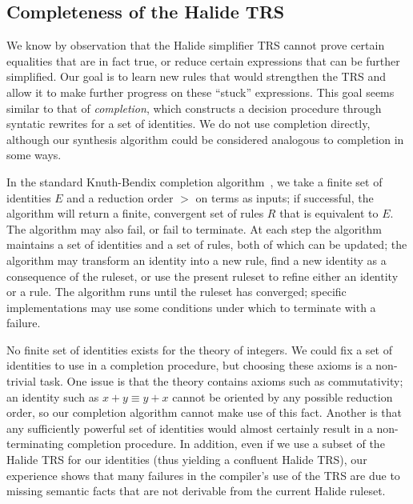 \subsection{Completeness of the Halide TRS}
\label{sec:completion}

We know by observation that the Halide simplifier TRS cannot prove certain equalities 
that are in fact true, or reduce certain expressions that can be further simplified. 
Our goal is to learn new rules that would strengthen the TRS and allow it to make
further progress on these ``stuck'' expressions. This goal seems similar to that of 
\emph{completion}, which constructs a decision procedure through syntatic rewrites
for a set of identities. We do not use completion directly, although
our synthesis algorithm could be considered analogous to completion in some ways.

In the standard Knuth-Bendix completion algorithm~\citep{knuth1983simple}, we take a
finite set of identities $E$ and a reduction order $>$ on terms as inputs; if successful, the
algorithm will return a finite, convergent set of rules $R$ that is equivalent to 
$E$. The algorithm may also fail, or fail to terminate. At each step the algorithm
maintains a set of identities and a set of rules, both of which can be updated; the 
algorithm may transform an identity into a new rule, find a new identity as a 
consequence of the ruleset, or use the present ruleset to refine either an identity 
or a rule. The algorithm runs until the ruleset has converged; specific implementations
may use some conditions under which to terminate with a failure.

No finite set of identities exists for the theory of integers. We could
fix a set of identities to use in a completion procedure, but choosing these axioms
is a non-trivial task. One issue is that the theory contains axioms such as commutativity;
an identity such as $x + y \equiv y + x$ cannot be oriented by any possible reduction 
order, so our completion algorithm cannot make use of this fact. Another is that any
sufficiently powerful set of identities would almost certainly result in a non-terminating
completion procedure.  In addition, even if we use a subset of the Halide TRS for our
identities (thus yielding a confluent Halide TRS), our experience shows that many
failures in the compiler's use of the TRS are due to missing semantic facts that are not
derivable from the current Halide ruleset.


